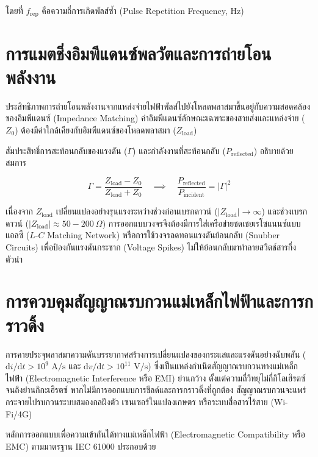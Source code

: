 โดยที่ $f_{\text{rep}}$ คือความถี่การเกิดพัลส์ซ้ำ (Pulse Repetition Frequency, Hz)

\section{การแมตชิ่งอิมพีแดนซ์พลวัตและการถ่ายโอนพลังงาน}

ประสิทธิภาพการถ่ายโอนพลังงานจากแหล่งจ่ายไฟฟ้าพัลส์ไปยังโหลดพลาสมาขึ้นอยู่กับความสอดคล้องของอิมพีแดนซ์ (Impedance Matching) ค่าอิมพีแดนซ์ลักษณะเฉพาะของสายส่งและแหล่งจ่าย ($Z_0$) ต้องมีค่าใกล้เคียงกับอิมพีแดนซ์ของโหลดพลาสมา ($Z_{\text{load}}$)

สัมประสิทธิ์การสะท้อนกลับของแรงดัน ($\Gamma$) และกำลังงานที่สะท้อนกลับ ($P_{\text{reflected}}$) อธิบายด้วยสมการ

\begin{equation}
    \Gamma = \frac{Z_{\text{load}} - Z_0}{Z_{\text{load}} + Z_0} \quad \implies \quad \frac{P_{\text{reflected}}}{P_{\text{incident}}} = |\Gamma|^2
    \label{eq:reflection_coeff}
\end{equation}

เนื่องจาก $Z_{\text{load}}$ เปลี่ยนแปลงอย่างรุนแรงระหว่างช่วงก่อนเบรกดาวน์ ($|Z_{\text{load}}| \to \infty$) และช่วงเบรกดาวน์ ($|Z_{\text{load}}| \approx 50 - 200 \ \Omega$) การออกแบบวงจรจึงต้องมีการใส่เครือข่ายชดเชยเรโซแนนซ์แบบแอลซี ($L\text{-}C$ Matching Network) หรือการใช้วงจรลดทอนแรงดันย้อนกลับ (Snubber Circuits) เพื่อป้องกันแรงดันกระชาก (Voltage Spikes) ไม่ให้ย้อนกลับมาทำลายสวิตช์สารกึ่งตัวนำ

\section{การควบคุมสัญญาณรบกวนแม่เหล็กไฟฟ้าและการกราวดิ้ง}

การคายประจุพลาสมาความดันบรรยากาศสร้างการเปลี่ยนแปลงของกระแสและแรงดันอย่างฉับพลัน ($\text{d}i/\text{d}t > 10^9 \text{ A/s}$ และ $\text{d}v/\text{d}t > 10^{11} \text{ V/s}$) ซึ่งเป็นแหล่งกำเนิดสัญญาณรบกวนทางแม่เหล็กไฟฟ้า (Electromagnetic Interference หรือ EMI) ย่านกว้าง ตั้งแต่ความถี่วิทยุไม่กี่กิโลเฮิรตซ์จนถึงย่านกิกะเฮิรตซ์ หากไม่มีการออกแบบการชีลด์และการกราวดิ้งที่ถูกต้อง สัญญาณรบกวนจะแพร่กระจายไปรบกวนระบบสมองกลฝังตัว เซนเซอร์ในแปลงเกษตร หรือระบบสื่อสารไร้สาย (Wi-Fi/4G)

หลักการออกแบบเพื่อความเข้ากันได้ทางแม่เหล็กไฟฟ้า (Electromagnetic Compatibility หรือ EMC) ตามมาตรฐาน IEC 61000 ประกอบด้วย

